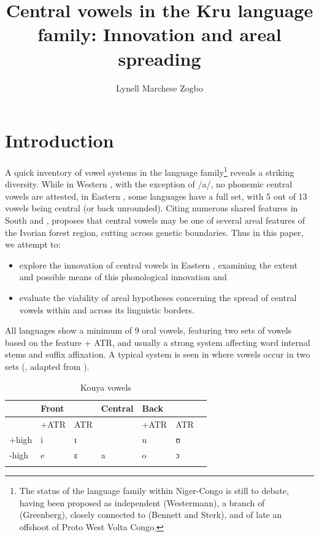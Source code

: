\documentclass[output=paper
,newtxmath
,modfonts
,nonflat]{langsci/langscibook}
\title{Central vowels in the Kru language family: Innovation and areal spreading}
\author{Lynell Marchese Zogbo\affiliation{University of the Free State; Institut de Linguistique Appliquée, Abidjan}}
\begin{document}
\maketitle
\providecommand{\nocaption}[1]{{\color{red} Please provide a caption}}
\section{Introduction}\label{sec:zogbo:1} 

A quick inventory of vowel systems in the  language family\footnote{The status of the  language family within Niger-Congo is still  to debate, having been proposed as independent (Westermann), a branch of  (Greenberg), closely connected to  (Bennett and Sterk), and of late \citep[18]{Williamson2000} an offshoot of Proto West Volta Congo.}  reveals a striking diversity.  While in Western , with the exception of /a/, no phonemic central vowels are attested, in Eastern , some languages have a full set, with 5 out of 13 vowels being central (or back unrounded). Citing numerous shared features in South  and , \citet{Vydrine2009} proposes that central vowels may be one of several areal features of the Ivorian forest region, cutting across genetic boundaries.  Thus in this paper, we attempt to:

\begin{itemize}
\item explore the innovation of central vowels in Eastern , examining the extent and possible means of this phonological innovation and \\[-0.75cm]
\item evaluate the viability of areal hypotheses concerning the spread of central vowels within  and across its linguistic borders. 
\end{itemize}

All  languages show a minimum of 9 oral vowels, featuring two sets of vowels based on the feature + ATR, and usually a strong  system affecting word internal stems and suffix affixation. A typical system is seen in  where vowels occur in two sets (, adapted from \citealt[50]{Saunders2009}).

\begin{table}[h]
\begin{tabular}{lllllll}
\lsptoprule
& Front   &&   Central &   Back &\\
\midrule
& +ATR & ATR   &   &  +ATR &  ATR\\

+high  &  i &	ɪ    &&   u  &  ʊ\\

-high  &  e & ɛ  &  a  &  o & ɔ\\
\lspbottomrule
\end{tabular}  
\caption{Kouya vowels}
\label{tab:zogbo:1}
\end{table}
\end{document}
